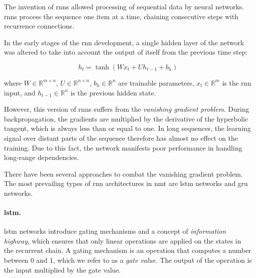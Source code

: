 The invention of \acp{rnn} \citep{elman1990finding} allowed processing of
sequential data by neural networks. \Acp{rnn} process the sequence one item at
a time, chaining consecutive steps with recurrence connections.

In the early stages of the \ac{rnn} development, a single hidden layer of the
network was altered to take into account the output of itself from the previous
time step:

%

\begin{equation} h_t = \tanh ( W x_t + U h_{t-1} + b_h ) \label{eq:vanilla-rnn}
\end{equation}

\noindent where $W \in \mathbb{R}^{m \times n}$,
$U \in \mathbb{R}^{n \times n}$, $b_h \in \mathbb{R}^{n}$ are trainable
parameters, $x_t \in \mathbb{R}^{m}$ is the \ac{rnn} input, and
$h_{t-1} \in \mathbb{R}^{n}$ is the previous hidden state.

However, this version of \acp{rnn} suffers from the \emph{vanishing gradient
  problem}. During backpropagation, the gradients are multiplied by the
derivative of the hyperbolic tangent, which is always less than or equal to
one. In long sequences, the learning signal over distant parts of the sequence
therefore has almost no effect on the training. Due to this fact, the network
manifests poor performance in handling long-range dependencies.

There have been several approaches to combat the vanishing gradient problem.
The most prevailing types of \ac{rnn} architectures in \ac{nmt} are \ac{lstm}
networks and \ac{gru} networks.

\paragraph{\acs{lstm}.} \acl{lstm} networks
\citep{hochreiter1997long,gers2000learning} introduce gating mechanisms and a
concept of \emph{information highway}, which ensures that only linear
operations are applied on the states in the recurrent chain. A gating mechanism
is an operation that computes a number between 0 and 1, which we refer to as a
\emph{gate value}.  The output of the operation is the input multiplied by the
gate value.

